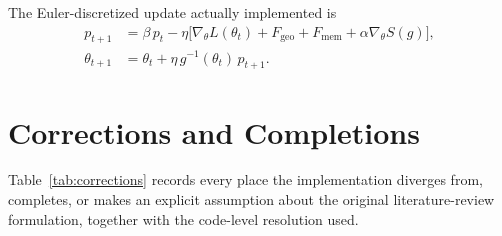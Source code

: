 \documentclass[11pt]{article}
\begin{document}
The Euler-discretized update actually implemented is
\begin{align}
p_{t+1} &= \beta\, p_t - \eta\Big[\nabla_\theta L(\theta_t) + F_{\mathrm{geo}} + F_{\mathrm{mem}}
+ \alpha \nabla_\theta S(g)\Big], \\
\theta_{t+1} &= \theta_t + \eta\, g^{-1}(\theta_t)\, p_{t+1}.
\end{align}

\section{Corrections and Completions}
\label{sec:corrections}

Table~\ref{tab:corrections} records every place the implementation diverges from, completes,
or makes an explicit assumption about the original literature-review formulation, together
with the code-level resolution used.
\end{document}
